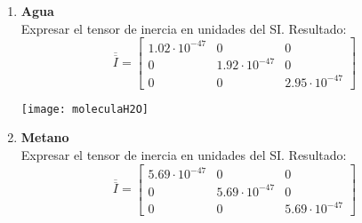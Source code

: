 \documentclass[11pt, spanish, a4paper, twoside]{article}
\begin{document}
\begin{enumerate}
	\item 
	\begin{minipage}[t][3cm]{0.73\textwidth}
	\textbf{Agua}\\
		Expresar el tensor de inercia en unidades del SI.
		Resultado:\\
		\[
			\overline{\overline{I}} = \left[\begin{matrix}1.02 \cdot 10^{-47} & 0 & 0\\0 & 1.92 \cdot 10^{-47} & 0\\0 & 0 & 2.95 \cdot 10^{-47}\end{matrix}\right]
		\]
	\end{minipage}
	\begin{minipage}[c][0cm][t]{0.2\textwidth}
		\texttt{[image: moleculaH2O]}
	\end{minipage}

	

	\item 
	\textbf{Metano}\\
	Expresar el tensor de inercia en unidades del SI.
		Resultado:\\
		\[
			\overline{\overline{I}} = \left[\begin{matrix}5.69 \cdot 10^{-47} & 0 & 0\\0 & 5.69 \cdot 10^{-47} & 0\\0 & 0 & 5.69 \cdot 10^{-47}\end{matrix}\right]
		\]



\end{enumerate}
\end{document}
